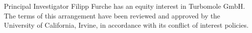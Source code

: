 \documentclass[twoside,twocolumn,9pt]{article}
\begin{document}
Principal Investigator Filipp Furche has an equity interest in Turbomole
GmbH. The terms of this arrangement have been reviewed and approved by
the University of California, Irvine, in accordance with its conflict of
interest policies. 


\balance


\end{document}
